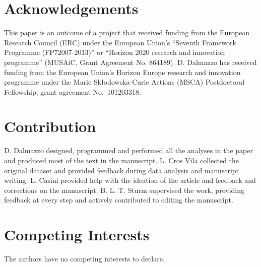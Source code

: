 \documentclass{article}
\begin{document}

\section*{Acknowledgements}
This paper is an outcome of a project that received funding from the European Research Council (ERC) under the European Union’s “Seventh Framework Programme (FP72007-2013)” or “Horizon 2020 research and innovation programme” (MUSAiC, Grant Agreement No. 864189).
D. Dalmazzo has received funding from the European Union's Horizon Europe research and innovation programme under the Marie Sk\l{}odowska-Curie Actions (MSCA) Postdoctoral Fellowship, grant agreement No.\ 101203318. 

\section{Contribution}
D. Dalmazzo designed, programmed and performed all the analyses in the paper and produced most of the text in the manuscript.
L. Cros Vila collected the original dataset and provided feedback during data analysis and manuscript writing.
L. Casini provided help with the ideation of the article and feedback and corrections on the manuscript.
B. L. T. Sturm supervised the work, providing feedback at every step and actively contributed to editing the manuscript.

\section{Competing Interests}
The authors have no competing interests to declare.


\end{document}
